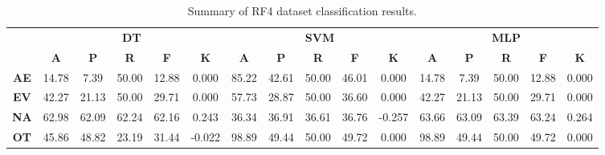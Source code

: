 \begin{landscape}
\begin{table}[htbp]
\footnotesize
\centering
\caption{Summary of RF4 dataset classification results.}
\label{tab:base_female}
\begin{tabular}{|c|c|c|c|c|c|c|c|c|c|c|c|c|c|c|c|}
\hline
\multirow{2}{*}{}	& \multicolumn{5}{c|}{\textbf{DT}}												& \multicolumn{5}{c|}{\textbf{SVM}}												& \multicolumn{5}{c|}{\textbf{MLP}}												\\ \cline{2-16} 
					& \textbf{A}	& \textbf{P}	& \textbf{R}	& \textbf{F}	& \textbf{K}	& \textbf{A}	& \textbf{P}	& \textbf{R}	& \textbf{F}	& \textbf{K}	& \textbf{A}	& \textbf{P}	& \textbf{R}	& \textbf{F}	& \textbf{K}	\\ \hline
\textbf{AE}			& 14.78			& 7.39			& 50.00			& 12.88			& 0.000			& 85.22			& 42.61			& 50.00			& 46.01			& 0.000			& 14.78			& 7.39			& 50.00			& 12.88			& 0.000			\\ \hline
\textbf{EV}			& 42.27			& 21.13			& 50.00			& 29.71			& 0.000			& 57.73			& 28.87			& 50.00			& 36.60			& 0.000			& 42.27			& 21.13			& 50.00			& 29.71			& 0.000			\\ \hline
\textbf{NA}			& 62.98			& 62.09			& 62.24			& 62.16			& 0.243			& 36.34			& 36.91			& 36.61			& 36.76			& -0.257			& 63.66			& 63.09			& 63.39			& 63.24			& 0.264			\\ \hline
\textbf{OT}			& 45.86			& 48.82			& 23.19			& 31.44			& -0.022			& 98.89			& 49.44			& 50.00			& 49.72			& 0.000			& 98.89			& 49.44			& 50.00			& 49.72			& 0.000			\\ \hline
\end{tabular}
\end{table}
\end{landscape}